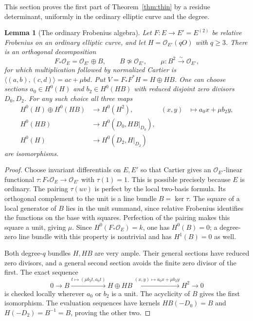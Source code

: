 \documentclass[11pt]{article}
\newtheorem{lemma}[theorem]{Lemma}
\theoremstyle{definition}\newtheorem{definition}[theorem]{Definition}
\theoremstyle{remark}\newtheorem{remark}[theorem]{Remark}
\newcommand{\OO}{\mathcal O}
\begin{document}
This section proves the first part of Theorem~\ref{thm:thin} by a residue determinant, uniformly in the ordinary elliptic curve and the degree.

\begin{lemma}[The ordinary Frobenius algebra]\label{lem:ordinary-algebra}
Let $F:E\to E'=E^{(2)}$ be relative Frobenius on an ordinary elliptic curve, and let $H=\OO_{E'}(qO)$ with $q\ge3$. There is an orthogonal decomposition
\[
 F_*\OO_E=\OO_{E'}\oplus B,\qquad B\not\simeq\OO_{E'},\qquad
 \mu:B^2\xrightarrow{\sim}\OO_{E'},
\]
for which multiplication followed by normalized Cartier is
$\langle(a,b),(c,d)\rangle=ac+\mu bd$.
Put $V=F_*F^*H=H\oplus HB$. One can choose sections $a_0\in H^0(H)$ and $b_2\in H^0(HB)$ with reduced disjoint zero divisors $D_0,D_2$. For any such choice all three maps
\begin{align*}
 H^0(H)\oplus H^0(HB)&\longrightarrow H^0(H^2),
 &(x,y)&\longmapsto a_0x+\mu b_2y,\\
 H^0(HB)&\longrightarrow H^0(D_0,HB|_{D_0}),&&\\
 H^0(H)&\longrightarrow H^0(D_2,H|_{D_2})&&
\end{align*}
are isomorphisms.
\end{lemma}
\begin{proof}
Choose invariant differentials on $E,E'$ so that Cartier gives an $\OO_{E'}$-linear functional $\tau:F_*\OO_E\to\OO_{E'}$ with $\tau(1)=1$. This is possible precisely because $E$ is ordinary. The pairing $\tau(uv)$ is perfect by the local two-basis formula. Its orthogonal complement to the unit is a line bundle $B=\ker\tau$. The square of a local generator of $B$ lies in the unit summand, since relative Frobenius identifies the functions on the base with squares. Perfection of the pairing makes this square a unit, giving $\mu$. Since $H^0(F_*\OO_E)=k$, one has $H^0(B)=0$; a degree-zero line bundle with this property is nontrivial and has $H^1(B)=0$ as well.

Both degree-$q$ bundles $H,HB$ are very ample. Their general sections have reduced zero divisors, and a general second section avoids the finite zero divisor of the first. The exact sequence
\[
0\longrightarrow B\xrightarrow{t\mapsto(\mu b_2t,a_0t)}
 H\oplus HB\xrightarrow{(x,y)\mapsto a_0x+\mu b_2y}H^2\longrightarrow0
\]
is checked locally wherever $a_0$ or $b_2$ is a unit. The acyclicity of $B$ gives the first isomorphism. The evaluation sequences have kernels $HB(-D_0)=B$ and $H(-D_2)=B^{-1}=B$, proving the other two.
\end{proof}
\end{document}
